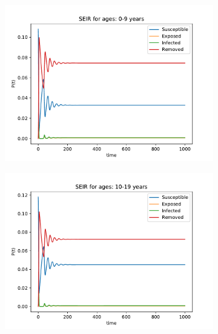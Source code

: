 \begin{figure}[H]
\centering
\begin{subfigure}{0.40\textwidth}
\includegraphics[width = \textwidth]{../fig/SEIR_0-9_n.pdf}
\caption{\protect}
\end{subfigure}
\begin{subfigure}{0.40\textwidth}
\includegraphics[width = \textwidth]{../fig/SEIR_10-19_n.pdf}
\caption{\protect}
\end{subfigure}
\begin{subfigure}{0.40\textwidth}

\end{subfigure}
\end{figure}
